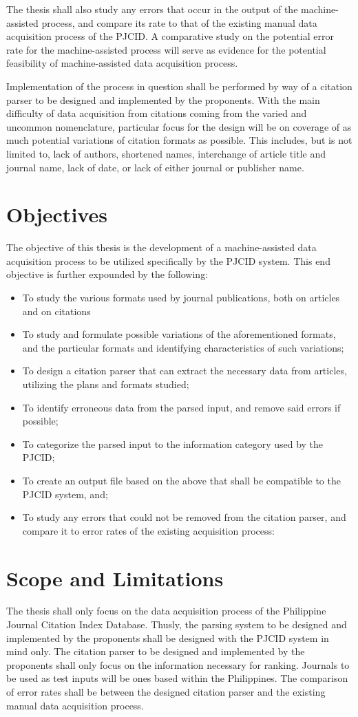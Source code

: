 The thesis shall also study any errors that occur in the output of the machine-assisted process, and compare its rate to that of the existing manual data acquisition process of the PJCID. A comparative study on the potential error rate for the machine-assisted process will serve as evidence for the potential feasibility of machine-assisted data acquisition process.

Implementation of the process in question shall be performed by way of a citation parser to be designed and implemented by the proponents. With the main difficulty of data acquisition from citations coming from the varied and uncommon nomenclature, particular focus for the design will be on coverage of as much potential variations of citation formats as possible. This includes, but is not limited to, lack of authors, shortened names, interchange of article title and journal name, lack of date, or lack of either journal or publisher name.

\section{Objectives}
The objective of this thesis is the development of a machine-assisted data acquisition process to be utilized specifically by the PJCID system. This end objective is further expounded by the following:
\begin{itemize}
	\item To study the various formats used by journal publications, both on articles and on citations
	\item To study and formulate possible variations of the aforementioned formats, and the particular formats and identifying characteristics of such variations;
	\item To design a citation parser that can extract the necessary data from articles, utilizing the plans and formats studied;
	\item To identify erroneous data from the parsed input, and remove said errors if possible;
	\item To categorize the parsed input to the information category used by the PJCID;
	\item To create an output file based on the above that shall be compatible to the PJCID system, and;
	\item To study any errors that could not be removed from the citation parser, and compare it to error rates of the existing acquisition process: 
\end{itemize}
\vfill\eject
\section{Scope and Limitations}
The thesis shall only focus on the data acquisition process of the Philippine Journal Citation Index Database. Thusly, the parsing system to be designed and implemented by the proponents shall be designed with the PJCID system in mind only. The citation parser to be designed and implemented by the proponents shall only focus on the information necessary for ranking. Journals to be used as test inputs will be ones based within the Philippines. The comparison of error rates shall be between the designed citation parser and the existing manual data acquisition process.
